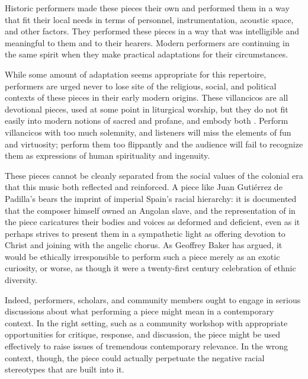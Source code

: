 Historic performers made these pieces their own and performed them in a way
that fit their local needs in terms of personnel, instrumentation, acoustic
space, and other factors.
They performed these pieces in a way that was intelligible and meaningful to
them and to their hearers.
Modern performers are continuing in the same spirit when they make practical
adaptations for their circumstances.

While some amount of adaptation seems appropriate for this repertoire,
performers are urged never to lose site of the religious, social, and political
contexts of these pieces in their early modern origins.
These villancicos are all devotional pieces, used at some point in liturgical
worship, but they do not fit easily into modern notions of sacred and profane,
and embody both .%
    \Autocite{Cashner:Cards}
Perform villancicos with too much solemnity, and listeners will miss the
elements of fun and virtuosity;
perform them too flippantly and the audience will fail to recognize them as
expressions of human spirituality and ingenuity.

These pieces cannot be cleanly separated from the social values of the colonial
era that this music both reflected and reinforced.
A piece like Juan Gutiérrez de Padilla's 
bears the imprint of imperial Spain's racial hierarchy: it is documented that
the composer himself owned an Angolan slave,%
    \Autocite{Mauleon:PadillaCivil}
and the representation of  in the piece caricatures their
bodies and voices as deformed and deficient, even as it perhaps strives to
present them in a sympathetic light as offering devotion to Christ and joining
with the angelic chorus.
As Geoffrey Baker has argued, it would be ethically irresponsible to perform
such a piece merely as an exotic curiosity, or worse, as though it were a
twenty-first century celebration of ethnic diversity.%
    \Autocite{Baker:PerformancePostColonial}

Indeed, performers, scholars, and community members ought to engage in serious
discussions about what performing a piece might mean in a contemporary context.
In the right setting, such as a community workshop with appropriate
opportunities for critique, response, and discussion, the piece might be used 
effectively to raise issues of tremendous contemporary relevance.
In the wrong context, though, the piece could actually perpetuate the negative
racial stereotypes that are built into it.



